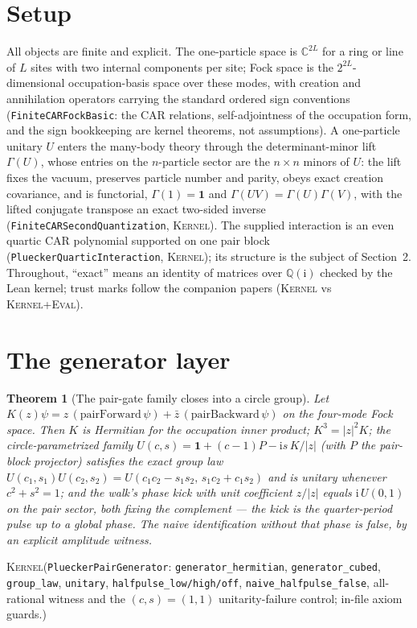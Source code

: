 \documentclass[11pt]{article}
\newcommand{\ii}{\mathrm{i}}
\newcommand{\id}{\mathbf{1}}
\newcommand{\C}{\mathbb{C}}
\newcommand{\Kernel}{\textcolor{kernelcolor}{\textsc{Kernel}}}
\newcommand{\DraftTrust}{\textcolor{draftcolor}{\textsc{Kernel+Eval}}}
\newtheorem{theorem}{Theorem}
\begin{document}
\section{Setup}

All objects are finite and explicit.  The one-particle space is
$\C^{2L}$ for a ring or line of $L$ sites with two internal components
per site; Fock space is the $2^{2L}$-dimensional occupation-basis space
over these modes, with creation and annihilation operators carrying the
standard ordered sign conventions (\texttt{FiniteCARFockBasic}: the CAR
relations, self-adjointness of the occupation form, and the sign
bookkeeping are kernel theorems, not assumptions).  A one-particle
unitary $U$ enters the many-body theory through the determinant-minor
lift $\Gamma(U)$, whose entries on the $n$-particle sector are the
$n\times n$ minors of $U$: the lift fixes the vacuum, preserves particle
number and parity, obeys exact creation covariance, and is functorial,
$\Gamma(1)=\id$ and $\Gamma(UV)=\Gamma(U)\Gamma(V)$, with the lifted
conjugate transpose an exact two-sided inverse
(\texttt{FiniteCARSecondQuantization}, \Kernel{}).  The supplied
interaction is an even quartic CAR polynomial supported on one pair
block (\texttt{PlueckerQuarticInteraction}, \Kernel{}); its structure is
the subject of Section~2.  Throughout, ``exact'' means an identity of
matrices over $\mathbb{Q}(\ii)$ checked by the Lean kernel; trust marks
follow the companion papers (\Kernel{} vs \DraftTrust{}).

\section{The generator layer}

\begin{theorem}[The pair-gate family closes into a circle group]\label{thm:gen}
Let $K(z)\psi = z\,(\text{pairForward}\,\psi) +
\bar z\,(\text{pairBackward}\,\psi)$ on the four-mode Fock space.  Then
$K$ is Hermitian for the occupation inner product; $K^3=|z|^2K$; the
circle-parametrized family
$U(c,s)=\id+(c-1)P-\ii s\,K/|z|$ (with $P$ the pair-block projector)
satisfies the exact group law
$U(c_1,s_1)U(c_2,s_2)=U(c_1c_2-s_1s_2,\,s_1c_2+c_1s_2)$ and is unitary
whenever $c^2+s^2=1$; and the walk's phase kick with unit coefficient
$z/|z|$ equals $\ii\,U(0,1)$ on the pair sector, both fixing the
complement --- the kick is the quarter-period pulse up to a global
phase.  The naive identification without that phase is false, by an
explicit amplitude witness.
\end{theorem}
\noindent\Kernel{}\quad(\texttt{PlueckerPairGenerator}:
\texttt{generator\_hermitian}, \texttt{generator\_cubed},
\texttt{group\_law}, \texttt{unitary}, \texttt{halfpulse\_low/high/off},
\texttt{naive\_halfpulse\_false}, all-rational witness and the
$(c,s)=(1,1)$ unitarity-failure control; in-file axiom guards.)
\end{document}
